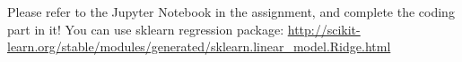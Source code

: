 \documentclass[11pt]{article}
\newenvironment{problem}[2][Problem]{\begin{trivlist}
\item[\hskip \labelsep {\bfseries #1}\hskip \labelsep {\bfseries #2.}]}{\end{trivlist}}
\begin{document}




\begin{problem}{4 (25 points) Linear and Quadratic Regression}
Please refer to the Jupyter Notebook in the assignment, and complete the coding part in it!
You can use sklearn regression package: \url{http://scikit-learn.org/stable/modules/generated/sklearn.linear_model.Ridge.html}
\end{problem}
\end{document}
